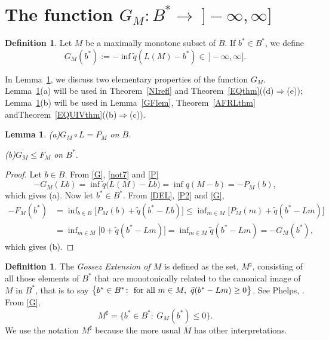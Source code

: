 \documentclass[letterpaper]{article}
\theoremstyle{plain}
\newtheorem{lemma}[theorem]{Lemma}
\theoremstyle{definition}
\newtheorem{definition}[theorem]{Definition}
\numberwithin{equation}{section}
\newcommand{\all}{\hbox{for all}}
\newcommand{\infn}{\inf\nolimits}
\newcommand{\lr}{\Longrightarrow}
\newcommand{\qt}{\wt q}
\newcommand{\rbar}{\,]{-}\infty,\infty]}
\newcommand{\wt}{\widetilde}
\newcommand{\Def}{Definition~\ref}
\newcommand{\Lem}{Lemma~\ref}
\newcommand{\Thm}{Theorem~\ref}
\begin{document}
\section{The function $G_M\colon B^* \to\ ]-\infty,\infty]$}\label{Gsec}
\begin{definition}\label{Gdef}
Let $M$ be a maximally monotone subset of $B$.  If $b^* \in B^*$, we define
\begin{equation}\label{G}
G_M(b^*) := -\inf\qt(L(M) - b^*) \in \rbar.
\end{equation}
\end{definition}
In \Lem{Glem}, we discuss two elementary properties of the function $G_M$.  \Lem{Glem}(a) will be used in \Thm{NIrefl} and \Thm{EQthm}\break\big((d)$\lr$(e)\big); \Lem{Glem}(b) will be used in \Lem{GFlem}, \Thm{AFRLthm} and\break \Thm{EQUIVthm}\big((b)$\lr$(c)\big).  
\begin{lemma}\label{Glem}
{\rm(a)}\enspace     $G_M\circ L = P_M$ on $B$.
\par\noindent
{\rm(b)}\enspace $G_M \le F_M$ on $B^*$.
\end{lemma}
%
\begin{proof}
Let $b \in B$. From \eqref{G}, \eqref{not7} and \eqref{P}
%
$$-G_M(Lb) = \inf \qt\big(L(M) - Lb\big) = \inf q(M - b) = -P_M(b),$$
%
which gives (a).   Now let $b^* \in B^*$.   From \eqref{DEL}, \eqref{P2} and \eqref{G},
\begin{align*}
-F_M(b^*) &= \infn_{b \in B}\big[P_M(b) + \qt(b^* - Lb)\big] \le \infn_{m \in M}\big[P_M(m) + \qt(b^* - Lm)\big]\\
& =  \infn_{m \in M}\big[0 + \qt(b^* - Lm)\big] =  \infn_{m \in M}\qt(b^* - Lm) = -G_M(b^*),
\end{align*}
%
which gives (b).
\end{proof}
\begin{definition}\label{MGdef}
The {\em Gossez Extension of $M$} is defined as the set, $M^\sharp$, consisting of all those elements of $B^*$ that are monotonically related to the canonical image of $M$ in $B^*$, that is to say $\big\{b^* \in B^*\colon\ \all\ m \in M,\ \qt(b^* - Lm) \ge 0\big\}$.     See Phelps, \cite[Definition 3.1, pp.\ 216-217]{PRAGUE}.  From \eqref{G},
\begin{equation}\label{MG}
M^\sharp = \big\{b^* \in B^*\colon\ G_M(b^*) \le 0\big\}.
\end{equation}
%
We use the notation $M^\sharp$ because the more usual $\overline{M}$ has other interpretations.
\end{definition}
\end{document}
